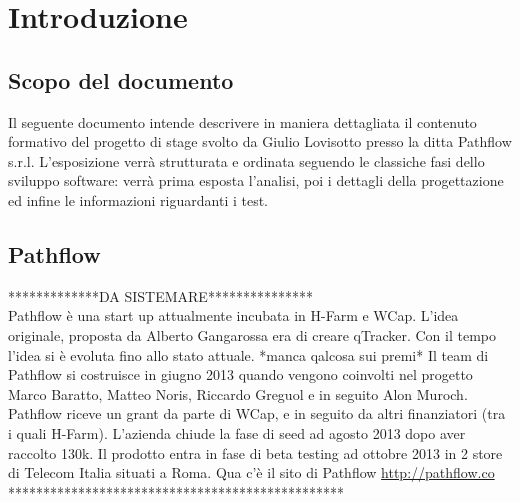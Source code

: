 
\section{Introduzione} \label{sec:greetings}
\subsection{Scopo del documento} %
Il seguente documento intende descrivere in maniera dettagliata il contenuto formativo del progetto di stage svolto da Giulio Lovisotto presso la ditta Pathflow s.r.l. L'esposizione verrà strutturata e ordinata seguendo le classiche fasi dello sviluppo software: verrà prima esposta l'analisi, poi i dettagli della progettazione ed infine le informazioni riguardanti i test.

\subsection{Pathflow} \label{sec:pathflow}

*************DA SISTEMARE*************** \\
Pathflow è una start up attualmente incubata in H-Farm e WCap. L'idea originale, proposta da Alberto Gangarossa era di creare qTracker. Con il tempo l'idea si è evoluta fino allo stato attuale. 
*manca qalcosa sui premi*
Il team di Pathflow si costruisce in giugno 2013 quando vengono coinvolti nel progetto Marco Baratto, Matteo Noris, Riccardo Greguol e in seguito Alon Muroch. Pathflow riceve un grant da parte di WCap, e in seguito da altri finanziatori (tra i quali H-Farm). L'azienda chiude la fase di seed ad agosto 2013 dopo aver raccolto 130k. Il prodotto entra in fase di beta testing ad ottobre 2013 in 2 store di Telecom Italia situati a Roma.
Qua c'è il sito di Pathflow \url{http://pathflow.co} \\
************************************************

